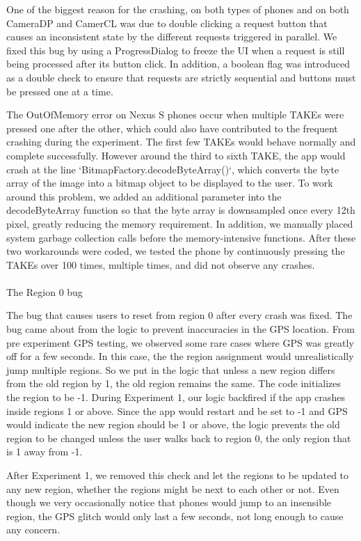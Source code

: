 One of the biggest reason for the crashing, on both types of phones and on both CameraDP and CamerCL was due to double clicking a request button that causes an inconsistent state by the different requests triggered in parallel. We fixed this bug by using a ProgressDialog to freeze the UI when a request is still being processed after its button click. In addition, a boolean flag was introduced as a double check to ensure that requests are strictly sequential and buttons must be pressed one at a time.

The OutOfMemory error on Nexus S phones occur when multiple TAKEs were pressed one after the other, which could also have contributed to the frequent crashing during the experiment. The first few TAKEs would behave normally and complete successfully. However around the third to sixth TAKE, the app would crash at the line `BitmapFactory.decodeByteArray()`, which converts the byte array of the image into a bitmap object to be displayed to the user.  To work around this problem, we added an additional parameter into the decodeByteArray function so that the byte array is downsampled once every 12th pixel, greatly reducing the memory requirement. In addition, we manually placed system garbage collection calls before the memory-intensive functions. After these two workarounds were coded, we tested the phone by continuously pressing the TAKEs over 100 times, multiple times, and did not observe any crashes.
\\
\\
The Region 0 bug

The bug that causes users to reset from region 0 after every crash was fixed. The bug came about from the logic to prevent inaccuracies in the GPS location. From pre experiment GPS testing, we observed some rare cases where GPS was greatly off for a few seconds. In this case, the the region assignment would unrealistically jump multiple regions. So we put in the logic that unless a new region differs from the old region by 1, the old region remains the same. The code initializes the region to be -1. During Experiment 1, our logic backfired if the app crashes inside regions 1 or above. Since the app would restart and be set to -1 and GPS would indicate the new region should be 1 or above, the logic prevents the old region to be changed unless the user walks back to region 0, the only region that is 1 away from -1.

After Experiment 1, we removed this check and let the regions to be updated to any new region, whether the regions might be next to each other or not. Even though we very occasionally notice that phones would jump to an insensible region, the GPS glitch would only last a few seconds, not long enough to cause any concern.

